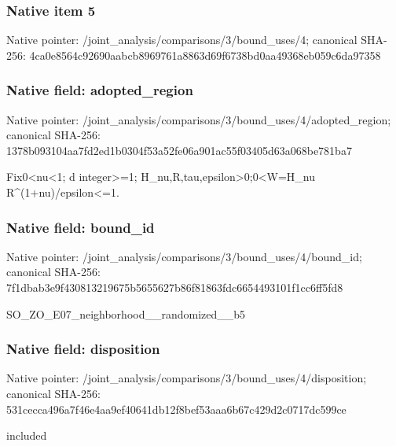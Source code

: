 \documentclass[10pt,a4paper]{article}
\begin{document}
\subsubsection{Native item 5}
Native pointer: /joint\_\allowbreak{}analysis/comparisons/3/bound\_\allowbreak{}uses/4; canonical SHA-256: 4ca0e8564c92690aabcb8969761a8863d69f6738bd0aa49368eb059c6da97358

\subsubsection{Native field: adopted\_\allowbreak{}region}
Native pointer: /joint\_\allowbreak{}analysis/comparisons/3/bound\_\allowbreak{}uses/4/adopted\_\allowbreak{}region; canonical SHA-256: 1378b093104aa7fd2ed1b0304f53a52fe06a901ac55f03405d63a068be781ba7

\begingroup\raggedright\sloppy Fix0<nu<1;\allowbreak{} d integer>=\allowbreak{}1;\allowbreak{} H\_\allowbreak{}nu,\allowbreak{}R,\allowbreak{}tau,\allowbreak{}epsilon>0;\allowbreak{}0<W=\allowbreak{}H\_\allowbreak{}nu R\textasciicircum{}(1+nu)/\allowbreak{}epsilon<=\allowbreak{}1.\par\endgroup

\subsubsection{Native field: bound\_\allowbreak{}id}
Native pointer: /joint\_\allowbreak{}analysis/comparisons/3/bound\_\allowbreak{}uses/4/bound\_\allowbreak{}id; canonical SHA-256: 7f1dbab3e9f430813219675b5655627b86f81863fdc6654493101f1cc6ff5fd8

\begingroup\raggedright\sloppy SO\_\allowbreak{}ZO\_\allowbreak{}E07\_\allowbreak{}neighborhood\_\allowbreak{}\_\allowbreak{}randomized\_\allowbreak{}\_\allowbreak{}b5\par\endgroup

\subsubsection{Native field: disposition}
Native pointer: /joint\_\allowbreak{}analysis/comparisons/3/bound\_\allowbreak{}uses/4/disposition; canonical SHA-256: 531cecca496a7f46e4aa9ef40641db12f8bef53aaa6b67c429d2c0717dc599ce

\begingroup\raggedright\sloppy included\par\endgroup
\end{document}
